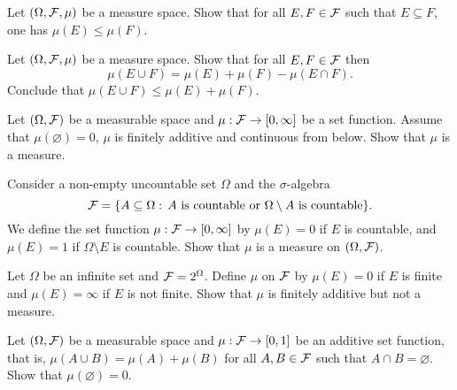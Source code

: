 \begin{problem} Let $(\Omega,\mathcal F,\mu)$ be a measure space. Show that for all $E,F\in \mathcal F$ such that $E\subseteq F$, one has $\mu(E)\leq \mu(F)$. 
\end{problem}

\begin{problem} Let $(\Omega,\mathcal F,\mu)$ be a measure space. Show that for all $E,F\in \mathcal F$ then
\begin{equation*}
    \mu(E\cup F) = \mu(E) + \mu(F) - \mu(E\cap F).
\end{equation*}    
Conclude that $\mu(E\cup F) \leq \mu(E) + \mu(F)$.
\end{problem}


\begin{problem}
    Let $(\Omega,\mathcal F)$ be a measurable space and $\mu:\mathcal F\to [0,\infty]$ be a set function. Assume that $\mu(\varnothing)=0$, $\mu$ is finitely additive and continuous from below. Show that $\mu$ is a measure.
\end{problem}

\begin{problem}
    Consider a non-empty uncountable set $\Omega$ and the $\sigma$-algebra 
    \begin{equation*}
        \mathcal F=\{A\subseteq \Omega:\, \text{$A$ is countable or $\Omega\setminus A$ is countable}\}. 
    \end{equation*}
    We define the set function $\mu : \mathcal F \to [0,\infty]$ by $\mu(E)=0$ if $E$ is countable, and $\mu(E)=1$ if $\Omega\setminus E$ is countable. Show that $\mu$ is a measure on $(\Omega,\mathcal F)$.
\end{problem}

\begin{problem}
Let $\Omega$ be an infinite set and $\mathcal F = 2^\Omega$. Define $\mu$ on $\mathcal F$ by $\mu(E)=0$ if $E$ is finite and $\mu(E)=\infty$ if $E$ is not finite. Show that $\mu$ is finitely additive but not a measure.     
\end{problem}

\begin{problem}
    Let $(\Omega,\mathcal F)$ be a measurable space and $\mu:\mathcal F\to [0,1]$ be an additive set function, that is, $\mu(A\cup B) = \mu(A) + \mu(B)$ for all $A,B\in \mathcal F$ such that $A\cap B = \varnothing$. Show that $\mu(\varnothing) = 0$.
\end{problem}

